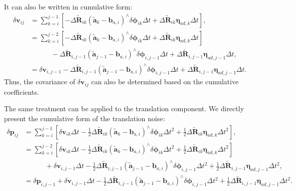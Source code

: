 It can also be written in cumulative form:
\begin{equation}\label{key}
	\begin{aligned}
		\delta \bm{v}_{ij} &= \sum_{k=i}^{j-1} \left[ -\Delta \tilde{\bm{R}}_{ik}(\tilde{\bm{a}}_k 
		-\bm{b}_{a,i})^\wedge \delta \boldsymbol{\phi}_{ik} \Delta t + \Delta \tilde{\bm{R}}_{ik} 
		\boldsymbol{\eta}_{ad,k} \Delta t \right], \\
		&= \sum_{k=i}^{j-2} \left[ -\Delta \tilde{\bm{R}}_{ik}(\tilde{\bm{a}}_k -\bm{b}_{a,i})^\wedge \delta 
		\boldsymbol{\phi}_{ik} \Delta t + \Delta \tilde{\bm{R}}_{ik} \boldsymbol{\eta}_{ad,k} \Delta t 
		\right] \\ 
		& \quad \quad \quad - \Delta \tilde{\bm{R}}_{i, j-1} (\tilde{\bm{a}}_{j-1} -\bm{b}_{a,i})^\wedge 
		\delta \boldsymbol{\phi}_{i, j-1} \Delta t + \Delta \tilde{\bm{R}}_{i,j-1} \boldsymbol{\eta}_{ad, j-1} 
		\Delta t, \\
		&= \delta \bm{v}_{i, j-1} - \Delta \tilde{\bm{R}}_{i,j-1} (\tilde{\bm{a}}_{j-1} -\bm{b}_{a, i})^\wedge 
		\delta \boldsymbol{\phi}_{i, j-1} \Delta t + \Delta \tilde{\bm{R}}_{i, j-1} \boldsymbol{\eta}_{ad, j-1} 
		\Delta t.
	\end{aligned}
\end{equation}
Thus, the covariance of $\delta \bm{v}_{ij}$ can also be determined based on the cumulative coefficients.

The same treatment can be applied to the translation component. We directly present the cumulative form of the translation noise:
\begin{equation}\label{key}
	\begin{aligned}
		\delta \bm{p}_{ij} &= \sum_{k=i}^{j-1} \left[ \delta \bm{v}_{ik} \Delta t - \frac{1}{2} \Delta 
		\tilde{\bm{R}}_{ik} (\tilde{\bm{a}}_k - \bm{b}_{a,i})^\wedge \delta \boldsymbol{\phi}_{ik} \Delta 
		t^2 + \frac{1}{2} \Delta \tilde{\bm{R}}_{ik} \boldsymbol{\eta}_{ad,k} \Delta t^2 \right], \\
		&= \sum_{k=i}^{j-2} \left[  \delta \bm{v}_{ik} \Delta t - \frac{1}{2} \Delta \tilde{\bm{R}}_{ik} 
		(\tilde{\bm{a}}_k - \bm{b}_{a,i})^\wedge \delta \boldsymbol{\phi}_{ik} \Delta t^2 + \frac{1}{2} 
		\Delta \tilde{\bm{R}}_{ik} \boldsymbol{\eta}_{ad,k} \Delta t^2 \right] \\
		& \quad \quad \quad + \delta \bm{v}_{i, j-1} \Delta t - \frac{1}{2} \Delta \tilde{\bm{R}}_{i, j-1}  
		(\tilde{\bm{a}}_{j-1} - \bm{b}_{a,i})^\wedge \delta \boldsymbol{\phi}_{i,j-1} \Delta t^2 + 
		\frac{1}{2} \Delta \tilde{\bm{R}}_{i,j-1} \boldsymbol{\eta}_{ad, j-1} \Delta t^2, \\
		&= \delta \bm{p}_{i,j-1} + \delta \bm{v}_{i,j-1} \Delta t - \frac{1}{2} \Delta \tilde{\bm{R}}_{i, j-1}  
		(\tilde{\bm{a}}_{j-1} - \bm{b}_{a,i})^\wedge \delta \boldsymbol{\phi}_{i,j-1} \Delta t^2 + 
		\frac{1}{2} \Delta \tilde{\bm{R}}_{i,j-1} \boldsymbol{\eta}_{ad, j-1} \Delta t^2 .
	\end{aligned}
\end{equation}

